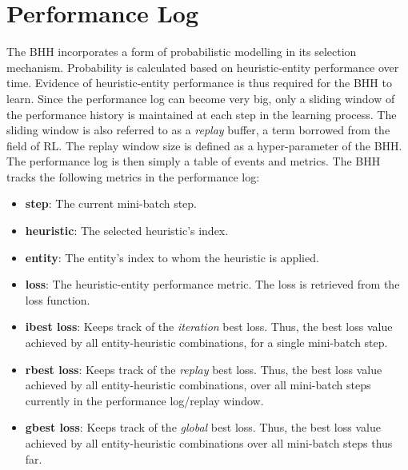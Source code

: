\section{Performance Log}\label{sec:bhh:performance_log}

The \acs{BHH} incorporates a form of probabilistic modelling in its selection mechanism. Probability is calculated based on heuristic-entity performance over time. Evidence of heuristic-entity performance is thus required for the \acs{BHH} to learn. Since the performance log can become very big, only a sliding window of the performance history is maintained at each step in the learning process. The sliding window is also referred to as a \textit{replay} buffer, a term borrowed from the field of \acf{RL}. The replay window size is defined as a hyper-parameter of the \acs{BHH}. The performance log is then simply a table of events and metrics. The \acs{BHH} tracks the following metrics in the performance log:

\begin{itemize}
      \item \textbf{step}: The current mini-batch step.

      \item \textbf{heuristic}: The selected heuristic's index.

      \item \textbf{entity}: The entity's index to whom the heuristic is applied.

      \item \textbf{loss}: The heuristic-entity performance metric. The loss is retrieved from the loss function.

      \item \textbf{ibest loss}: Keeps track of the \textit{iteration} best loss. Thus, the best loss value achieved by all entity-heuristic combinations, for a single mini-batch step.

      \item \textbf{rbest loss}:  Keeps track of the \textit{replay} best loss. Thus, the best loss value achieved by all entity-heuristic combinations, over all mini-batch steps currently in the performance log/replay window.

      \item \textbf{gbest loss}:  Keeps track of the \textit{global} best loss. Thus, the best loss value achieved by all entity-heuristic combinations over all mini-batch steps thus far.
\end{itemize}

